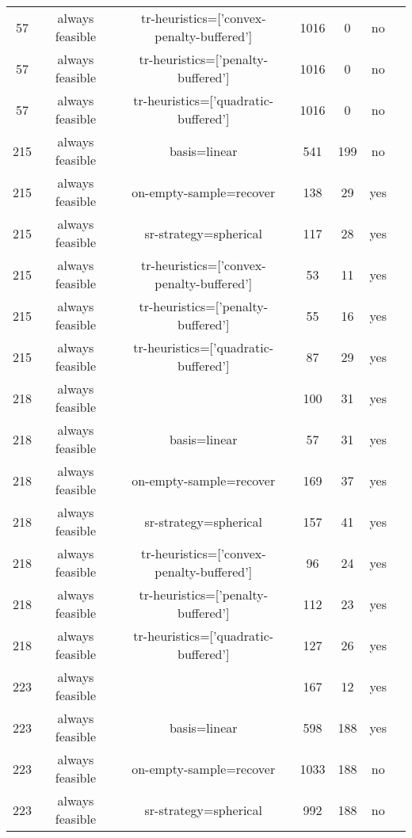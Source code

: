\begin{footnotesize}
\begin{center}
\begin{longtable}{ccccccc}
 57 & always feasible & tr-heuristics=['convex-penalty-buffered'] &   1016 &      0 &      no\\
 57 & always feasible &        tr-heuristics=['penalty-buffered'] &   1016 &      0 &      no\\
 57 & always feasible &      tr-heuristics=['quadratic-buffered'] &   1016 &      0 &      no\\
215 & always feasible &                              basis=linear &    541 &    199 &      no\\
215 & always feasible &                   on-empty-sample=recover &    138 &     29 &     yes\\
215 & always feasible &                     sr-strategy=spherical &    117 &     28 &     yes\\
215 & always feasible & tr-heuristics=['convex-penalty-buffered'] &     53 &     11 &     yes\\
215 & always feasible &        tr-heuristics=['penalty-buffered'] &     55 &     16 &     yes\\
215 & always feasible &      tr-heuristics=['quadratic-buffered'] &     87 &     29 &     yes\\
218 & always feasible &                                           &    100 &     31 &     yes\\
218 & always feasible &                              basis=linear &     57 &     31 &     yes\\
218 & always feasible &                   on-empty-sample=recover &    169 &     37 &     yes\\
218 & always feasible &                     sr-strategy=spherical &    157 &     41 &     yes\\
218 & always feasible & tr-heuristics=['convex-penalty-buffered'] &     96 &     24 &     yes\\
218 & always feasible &        tr-heuristics=['penalty-buffered'] &    112 &     23 &     yes\\
218 & always feasible &      tr-heuristics=['quadratic-buffered'] &    127 &     26 &     yes\\
223 & always feasible &                                           &    167 &     12 &     yes\\
223 & always feasible &                              basis=linear &    598 &    188 &     yes\\
223 & always feasible &                   on-empty-sample=recover &   1033 &    188 &      no\\
223 & always feasible &                     sr-strategy=spherical &    992 &    188 &      no\\

\end{longtable}
\end{center}
\end{footnotesize}
